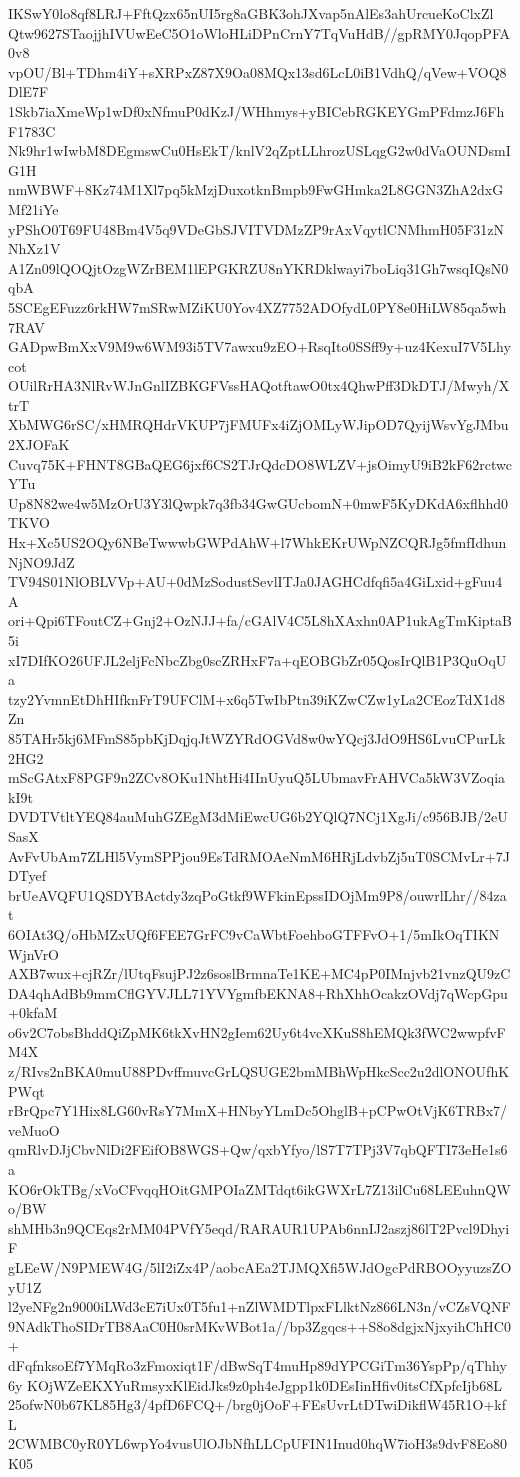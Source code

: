 IKSwY0lo8qf8LRJ+FftQzx65nUI5rg8aGBK3ohJXvap5nAlEs3ahUrcueKoClxZl
Qtw9627STaojjhIVUwEeC5O1oWloHLiDPnCrnY7TqVuHdB//gpRMY0JqopPFA0v8
vpOU/Bl+TDhm4iY+sXRPxZ87X9Oa08MQx13sd6LcL0iB1VdhQ/qVew+VOQ8DlE7F
1Skb7iaXmeWp1wDf0xNfmuP0dKzJ/WHhmys+yBICebRGKEYGmPFdmzJ6FhF1783C
Nk9hr1wIwbM8DEgmswCu0HsEkT/knlV2qZptLLhrozUSLqgG2w0dVaOUNDsmIG1H
nmWBWF+8Kz74M1Xl7pq5kMzjDuxotknBmpb9FwGHmka2L8GGN3ZhA2dxGMf21iYe
yPShO0T69FU48Bm4V5q9VDeGbSJVITVDMzZP9rAxVqytlCNMhmH05F31zNNhXz1V
A1Zn09lQOQjtOzgWZrBEM1lEPGKRZU8nYKRDklwayi7boLiq31Gh7wsqIQsN0qbA
5SCEgEFuzz6rkHW7mSRwMZiKU0Yov4XZ7752ADOfydL0PY8e0HiLW85qa5wh7RAV
GADpwBmXxV9M9w6WM93i5TV7awxu9zEO+RsqIto0SSff9y+uz4KexuI7V5Lhycot
OUilRrHA3NlRvWJnGnlIZBKGFVssHAQotftawO0tx4QhwPff3DkDTJ/Mwyh/XtrT
XbMWG6rSC/xHMRQHdrVKUP7jFMUFx4iZjOMLyWJipOD7QyijWsvYgJMbu2XJOFaK
Cuvq75K+FHNT8GBaQEG6jxf6CS2TJrQdcDO8WLZV+jsOimyU9iB2kF62rctwcYTu
Up8N82we4w5MzOrU3Y3lQwpk7q3fb34GwGUcbomN+0mwF5KyDKdA6xflhhd0TKVO
Hx+Xc5US2OQy6NBeTwwwbGWPdAhW+l7WhkEKrUWpNZCQRJg5fmfIdhunNjNO9JdZ
TV94S01NlOBLVVp+AU+0dMzSodustSevlITJa0JAGHCdfqfi5a4GiLxid+gFuu4A
ori+Qpi6TFoutCZ+Gnj2+OzNJJ+fa/cGAlV4C5L8hXAxhn0AP1ukAgTmKiptaB5i
xI7DIfKO26UFJL2eljFcNbcZbg0scZRHxF7a+qEOBGbZr05QosIrQlB1P3QuOqUa
tzy2YvmnEtDhHIfknFrT9UFClM+x6q5TwIbPtn39iKZwCZw1yLa2CEozTdX1d8Zn
85TAHr5kj6MFmS85pbKjDqjqJtWZYRdOGVd8w0wYQcj3JdO9HS6LvuCPurLk2HG2
mScGAtxF8PGF9n2ZCv8OKu1NhtHi4IInUyuQ5LUbmavFrAHVCa5kW3VZoqiakI9t
DVDTVtltYEQ84auMuhGZEgM3dMiEwcUG6b2YQlQ7NCj1XgJi/c956BJB/2eUSasX
AvFvUbAm7ZLHl5VymSPPjou9EsTdRMOAeNmM6HRjLdvbZj5uT0SCMvLr+7JDTyef
brUeAVQFU1QSDYBActdy3zqPoGtkf9WFkinEpssIDOjMm9P8/ouwrlLhr//84zat
6OIAt3Q/oHbMZxUQf6FEE7GrFC9vCaWbtFoehboGTFFvO+1/5mIkOqTIKNWjnVrO
AXB7wux+cjRZr/lUtqFsujPJ2z6soslBrmnaTe1KE+MC4pP0IMnjvb21vnzQU9zC
DA4qhAdBb9mmCflGYVJLL71YVYgmfbEKNA8+RhXhhOcakzOVdj7qWcpGpu+0kfaM
o6v2C7obsBhddQiZpMK6tkXvHN2gIem62Uy6t4vcXKuS8hEMQk3fWC2wwpfvFM4X
z/RIvs2nBKA0muU88PDvffmuvcGrLQSUGE2bmMBhWpHkcScc2u2dlONOUfhKPWqt
rBrQpc7Y1Hix8LG60vRsY7MmX+HNbyYLmDc5OhglB+pCPwOtVjK6TRBx7/veMuoO
qmRlvDJjCbvNlDi2FEifOB8WGS+Qw/qxbYfyo/lS7T7TPj3V7qbQFTI73eHe1s6a
KO6rOkTBg/xVoCFvqqHOitGMPOIaZMTdqt6ikGWXrL7Z13ilCu68LEEuhnQWo/BW
shMHb3n9QCEqs2rMM04PVfY5eqd/RARAUR1UPAb6nnIJ2aszj86lT2Pvcl9DhyiF
gLEeW/N9PMEW4G/5lI2iZx4P/aobcAEa2TJMQXfi5WJdOgcPdRBOOyyuzsZOyU1Z
l2yeNFg2n9000iLWd3cE7iUx0T5fu1+nZlWMDTlpxFLlktNz866LN3n/vCZsVQNF
9NAdkThoSIDrTB8AaC0H0srMKvWBot1a//bp3Zgqcs++S8o8dgjxNjxyihChHC0+
dFqfnksoEf7YMqRo3zFmoxiqt1F/dBwSqT4muHp89dYPCGiTm36YspPp/qThhy6y
KOjWZeEKXYuRmsyxKlEidJks9z0ph4eJgpp1k0DEsIinHfiv0itsCfXpfcIjb68L
25ofwN0b67KL85Hg3/4pfD6FCQ+/brg0jOoF+FEsUvrLtDTwiDikflW45R1O+kfL
2CWMBC0yR0YL6wpYo4vusUlOJbNfhLLCpUFIN1Inud0hqW7ioH3s9dvF8Eo80K05
